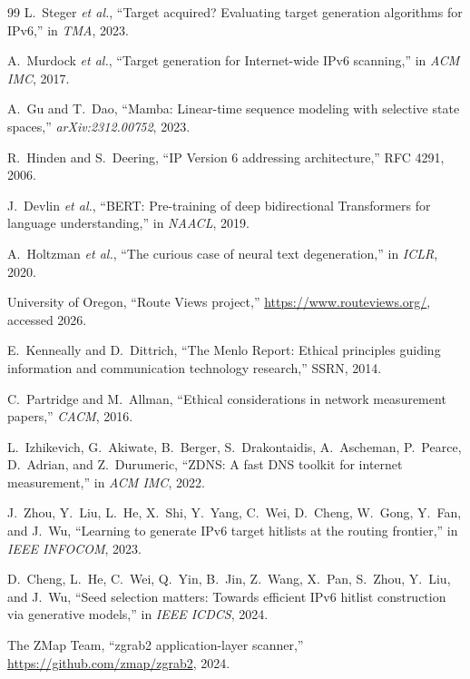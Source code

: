\documentclass[conference]{IEEEtran}
\begin{document}
\begin{thebibliography}{99}
L.~Steger \emph{et al.},
``Target acquired? Evaluating target generation algorithms for IPv6,''
in \emph{TMA}, 2023.

A.~Murdock \emph{et al.},
``Target generation for Internet-wide IPv6 scanning,''
in \emph{ACM IMC}, 2017.

A.~Gu and T.~Dao,
``Mamba: Linear-time sequence modeling with selective state spaces,''
\emph{arXiv:2312.00752}, 2023.

R.~Hinden and S.~Deering,
``IP Version 6 addressing architecture,''
RFC 4291, 2006.

J.~Devlin \emph{et al.},
``BERT: Pre-training of deep bidirectional Transformers for
language understanding,''
in \emph{NAACL}, 2019.

A.~Holtzman \emph{et al.},
``The curious case of neural text degeneration,''
in \emph{ICLR}, 2020.

University of Oregon,
``Route Views project,''
\url{https://www.routeviews.org/}, accessed 2026.

E.~Kenneally and D.~Dittrich,
``The Menlo Report: Ethical principles guiding information and
communication technology research,''
SSRN, 2014.

C.~Partridge and M.~Allman,
``Ethical considerations in network measurement papers,''
\emph{CACM}, 2016.

L.~Izhikevich, G.~Akiwate, B.~Berger, S.~Drakontaidis, A.~Ascheman,
P.~Pearce, D.~Adrian, and Z.~Durumeric,
``ZDNS: A fast DNS toolkit for internet measurement,''
in \emph{ACM IMC}, 2022.





J.~Zhou, Y.~Liu, L.~He, X.~Shi, Y.~Yang, C.~Wei, D.~Cheng, W.~Gong,
Y.~Fan, and J.~Wu,
``Learning to generate IPv6 target hitlists at the routing frontier,''
in \emph{IEEE INFOCOM}, 2023.

D.~Cheng, L.~He, C.~Wei, Q.~Yin, B.~Jin, Z.~Wang, X.~Pan, S.~Zhou,
Y.~Liu, and J.~Wu,
``Seed selection matters: Towards efficient IPv6 hitlist construction
via generative models,''
in \emph{IEEE ICDCS}, 2024.

The ZMap Team,
``zgrab2 application-layer scanner,''
\url{https://github.com/zmap/zgrab2}, 2024.




\end{thebibliography}
\end{document}

